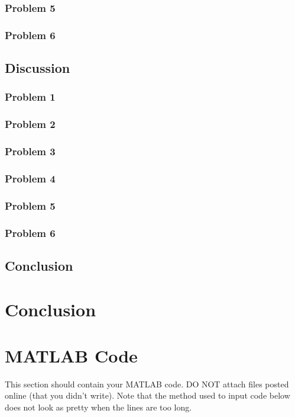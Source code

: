 \documentclass[12pt, a4paper]{article}%
\begin{document}
\subsubsection*{Problem 5}
\subsubsection*{Problem 6}

\subsection*{Discussion}
\label{S:5}

\subsubsection*{Problem 1}
\subsubsection*{Problem 2}
\subsubsection*{Problem 3}
\subsubsection*{Problem 4}
\subsubsection*{Problem 5}
\subsubsection*{Problem 6}

\subsection*{Conclusion}
\label{S:6}

\section{Conclusion}

\newpage

\section{MATLAB Code}\label{sec:matlab}
This section should contain your MATLAB code. DO NOT attach files posted online (that you didn't write). Note that the method used to input code below does not look as pretty when the lines are too long.
\end{document}

